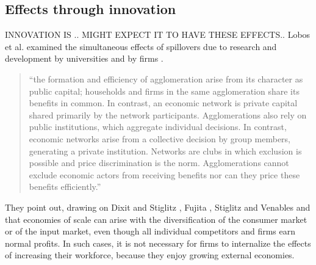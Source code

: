 
         


\subsection{Effects through innovation}
INNOVATION IS .. MIGHT EXPECT IT TO HAVE THESE EFFECTS.. 
Lobos et al. examined the simultaneous effects of spillovers due to research and development by universities and by firms \cite{belderbosWhatSpilloversUniversities2022}.

\begin{quotation}
``the formation and efficiency of agglomeration arise from its character as public capital; households and firms in the same agglomeration share its benefits in common. In contrast, an economic network is private capital shared primarily by the network participants. Agglomerations also rely on public institutions, which aggregate individual decisions. In contrast, economic networks arise from a collective decision by group members, generating a private institution. Networks are clubs in which exclusion is possible and price discrimination is the norm. Agglomerations cannot exclude economic actors from receiving benefits nor can they price these benefits efficiently.''
\end{quotation}
They point out, drawing on Dixit and Stiglitz \cite{AvinashK.Dixit1977MCaO},  Fujita \cite{fujitaMonopolisticCompetitionModel1988}, Stiglitz and Venables and \cite{fujitaSpatialEconomyCities1999} that economies of scale  can arise with the diversification of the consumer market or of the input market, even though all individual competitors and firms earn normal profits. In such cases, it is not necessary for firms to internalize the effects of increasing their workforce, because they enjoy growing external economies.

